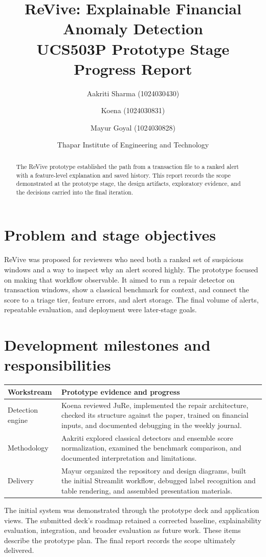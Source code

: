 \documentclass[11pt,a4paper]{article}
\title{ReVive: Explainable Financial Anomaly Detection\\\large UCS503P Prototype Stage Progress Report}
\author{Aakriti Sharma (1024030430) \and Koena (1024030831) \and Mayur Goyal (1024030828)}
\date{Thapar Institute of Engineering and Technology}
\begin{document}
\maketitle
\begin{abstract}
The ReVive prototype established the path from a transaction file to a ranked alert with a feature-level explanation and saved history. This report records the scope demonstrated at the prototype stage, the design artifacts, exploratory evidence, and the decisions carried into the final iteration.
\end{abstract}

\section{Problem and stage objectives}
ReVive was proposed for reviewers who need both a ranked set of suspicious windows and a way to inspect why an alert scored highly. The prototype focused on making that workflow observable. It aimed to run a repair detector on transaction windows, show a classical benchmark for context, and connect the score to a triage tier, feature errors, and alert storage. The final volume of alerts, repeatable evaluation, and deployment were later-stage goals.

\section{Development milestones and responsibilities}
\noindent\begin{tabularx}{\linewidth}{@{}lX@{}}
\toprule
Workstream & Prototype evidence and progress\\
\midrule
Detection engine & Koena reviewed JuRe, implemented the repair architecture, checked its structure against the paper, trained on financial inputs, and documented debugging in the weekly journal.\\
Methodology & Aakriti explored classical detectors and ensemble score normalization, examined the benchmark comparison, and documented interpretation and limitations.\\
Delivery & Mayur organized the repository and design diagrams, built the initial Streamlit workflow, debugged label recognition and table rendering, and assembled presentation materials.\\
\bottomrule
\end{tabularx}

The initial system was demonstrated through the prototype deck and application views. The submitted deck's roadmap retained a corrected baseline, explainability evaluation, integration, and broader evaluation as future work. These items describe the prototype plan. The final report records the scope ultimately delivered.
\end{document}
